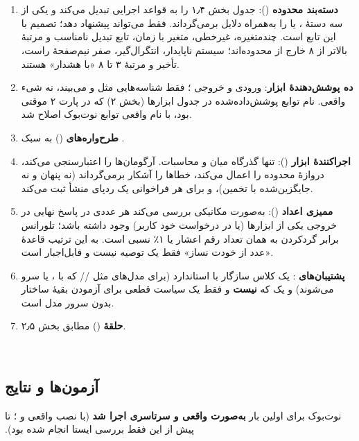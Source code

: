 ‫\documentclass[a4paper,12pt]{article}
\begin{document}
‫\begin{enumerate}
‫\item \textbf{دسته‌بند محدوده} (\texttt{}): جدول بخش ۱٫۴ را به قواعد اجرایی تبدیل می‌کند و یکی از سه دستهٔ \texttt{}، \texttt{} یا \texttt{} را به‌همراه دلایل برمی‌گرداند.  فقط می‌تواند پیشنهاد دهد؛ تصمیم با این تابع است. چندمتغیره، غیرخطی، متغیر با زمان، تابع تبدیل نامناسب و مرتبهٔ بالاتر از ۸ خارج از محدوده‌اند؛ سیستم ناپایدار، انتگرال‌گیر، صفر نیم‌صفحهٔ راست، تأخیر و مرتبهٔ ۳ تا ۸ «با هشدار» هستند.
‫\item \textbf{ده پوشش‌دهندهٔ ابزار}: ورودی و خروجی ؛  فقط شناسه‌هایی مثل  و  می‌بیند، نه شیء واقعی. نام توابع پوشش‌داده‌شده در جدول ابزارها (بخش ۲) که در پارت ۲ موقتی بود، با نام واقعی توابع نوت‌بوک اصلاح شد.
‫\item \textbf{طرح‌واره‌های } (\texttt{}) به سبک .
‫\item \textbf{اجراکنندهٔ ابزار} (\texttt{}): تنها گذرگاه میان  و محاسبات. آرگومان‌ها را اعتبارسنجی می‌کند، دروازهٔ محدوده را اعمال می‌کند، خطاها را آشکار برمی‌گرداند (نه پنهان و نه جایگزین‌شده با تخمین)، و برای هر فراخوانی یک ردپای منشأ ثبت می‌کند.
‫\item \textbf{ممیزی اعداد} (\texttt{}): به‌صورت مکانیکی بررسی می‌کند هر عددی در پاسخ نهایی در خروجی یکی از ابزارها (یا در درخواست خود کاربر) وجود داشته باشد؛ تلورانس برابر گرد‌کردن به همان تعداد رقم اعشار یا ۱٪ نسبی است. به این ترتیب قاعدهٔ «عدد از خودت نساز» فقط یک توصیه نیست و قابل‌اجبار است.
‫\item \textbf{پشتیبان‌های }: یک کلاس سازگار با  استاندارد  (برای مدل‌های  مثل // که با ،  یا  سرو می‌شوند) و یک \texttt{} که \textbf{ نیست} و فقط یک سیاست قطعی برای آزمودن بقیهٔ ساختار بدون سرور مدل است.
‫\item \textbf{حلقهٔ } (\texttt{}) مطابق بخش ۲٫۵.
‫\end{enumerate}
‫
‫\subsection{آزمون‌ها و نتایج}
‫نوت‌بوک برای اولین بار \textbf{به‌صورت واقعی و سرتاسری اجرا شد} (با نصب
‫واقعی  و ؛ تا پیش از این فقط بررسی ایستا انجام شده بود).
\end{document}
